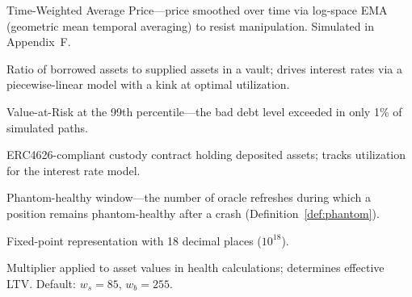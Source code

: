 \documentclass[10pt,a4paper,twocolumn]{article}
\theoremstyle{definition}
\theoremstyle{plain}
\theoremstyle{remark}
\begin{document}
\begin{description}[style=nextline, leftmargin=2.5em, labelindent=0em, font=\normalfont\bfseries]
\item[TWAP] Time-Weighted Average Price---price smoothed over time via log-space EMA (geometric mean temporal averaging) to resist manipulation. Simulated in Appendix~F.


\item[Utilization] Ratio of borrowed assets to supplied assets in a vault; drives interest rates via a piecewise-linear model with a kink at optimal utilization.


\item[$\text{VaR}(99\%)$\,$\dagger$] Value-at-Risk at the 99th percentile---the bad debt level exceeded in only 1\% of simulated paths.

\item[Vault] ERC4626-compliant custody contract holding deposited assets; tracks utilization for the interest rate model.


\item[$W$\,$\dagger$] Phantom-healthy window---the number of oracle refreshes during which a position remains phantom-healthy after a crash (Definition~\ref{def:phantom}).

\item[WAD] Fixed-point representation with 18 decimal places ($10^{18}$).

\item[Weight] Multiplier applied to asset values in health calculations; determines effective LTV. Default: $w_s = 85$, $w_b = 255$.

\end{description}

\clearpage
\ifodd\value{page}\else\thispagestyle{empty}\null\clearpage\fi
\end{document}
